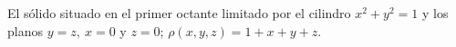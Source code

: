 \item El sólido situado en el primer octante limitado por el cilindro $x^2 + y^2 = 1$ y los planos $y = z, \ x = 0$ y $z = 0$; $\rho(x, y, z) = 1 + x + y + z$.
